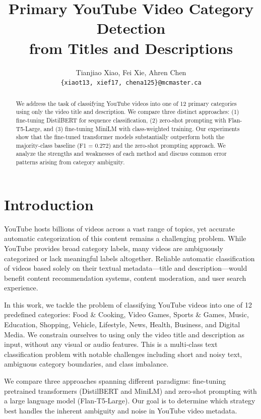 \documentclass[11pt]{article}
\title{Primary YouTube Video Category Detection\\from Titles and Descriptions}
\author{Tianjiao Xiao, Fei Xie, Ahren Chen \\
  \texttt{\{xiaot13, xief17, chena125\}@mcmaster.ca} }
\begin{document}
\maketitle

\begin{abstract}
We address the task of classifying YouTube videos into one of 12 primary categories using only the video title and description. We compare three distinct approaches: (1) fine-tuning DistilBERT for sequence classification, (2) zero-shot prompting with Flan-T5-Large, and (3) fine-tuning MiniLM with class-weighted training. Our experiments show that the fine-tuned transformer models substantially outperform both the majority-class baseline (F1 = 0.272) and the zero-shot prompting approach. We analyze the strengths and weaknesses of each method and discuss common error patterns arising from category ambiguity.
\end{abstract}

\section{Introduction}

YouTube hosts billions of videos across a vast range of topics, yet accurate automatic categorization of this content remains a challenging problem. While YouTube provides broad category labels, many videos are ambiguously categorized or lack meaningful labels altogether. Reliable automatic classification of videos based solely on their textual metadata---title and description---would benefit content recommendation systems, content moderation, and user search experience.

In this work, we tackle the problem of classifying YouTube videos into one of 12 predefined categories: Food \& Cooking, Video Games, Sports \& Games, Music, Education, Shopping, Vehicle, Lifestyle, News, Health, Business, and Digital Media. We constrain ourselves to using only the video title and description as input, without any visual or audio features. This is a multi-class text classification problem with notable challenges including short and noisy text, ambiguous category boundaries, and class imbalance.

We compare three approaches spanning different paradigms: fine-tuning pretrained transformers (DistilBERT and MiniLM) and zero-shot prompting with a large language model (Flan-T5-Large). Our goal is to determine which strategy best handles the inherent ambiguity and noise in YouTube video metadata.
\end{document}
